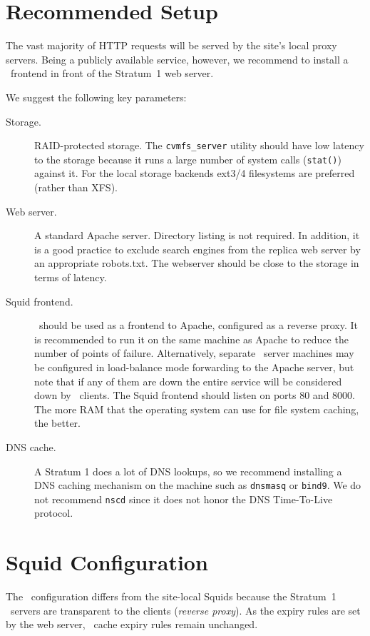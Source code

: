 \section{Recommended Setup}
The vast majority of HTTP requests will be served by the site's local
proxy servers.
Being a publicly available service, however, we recommend to install
a \squid\ frontend in front of the Stratum~1 web server.

We suggest the following key parameters:
\begin{description}
	\item[Storage.] 
		RAID-protected storage.
		The \texttt{cvmfs\_server} utility should have low latency to the storage because it runs a large number of system calls (\texttt{stat()}) against it.
		For the local storage backends ext3/4 filesystems are preferred (rather than XFS).
	\item[Web server.]
		A standard Apache server.
		Directory listing is not required.
		In addition, it is a good practice to exclude search engines from the replica web server by an appropriate robots.txt.
		The webserver should be close to the storage in terms of latency.
	\item[Squid frontend.]
		\squid\ should be used as a frontend to Apache, configured
		as a reverse proxy.  It is recommended to run it on the
		same machine as Apache to reduce the number of points of
		failure.  Alternatively, separate \squid\ server machines
		may be configured in load-balance mode forwarding to the
		Apache server, but note that if any of them are down
		the entire service will be considered down by \cvmfs\
		clients.
		The Squid frontend should listen on ports 80 and 8000.
		The more RAM that the operating system can use for file
		system caching, the better.

	\item[DNS cache.]
		A Stratum 1 does a lot of DNS lookups, so we recommend
		installing a DNS caching mechanism on the machine such
		as \texttt{dnsmasq} or \texttt{bind9}.  We do not recommend
		\texttt{nscd} since it does not honor the DNS Time-To-Live
		protocol.
\end{description}

\section{Squid Configuration}
The \squid\ configuration differs from the site-local Squids
because the Stratum~1 \squid\ servers are transparent to the clients
(\emph{reverse proxy}).
As the expiry rules are set by the web server, \squid\ cache expiry
rules remain unchanged.

